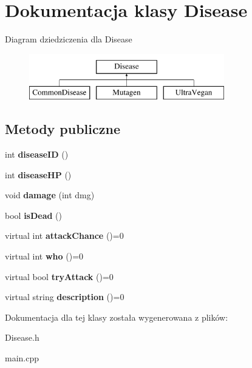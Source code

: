 \hypertarget{classDisease}{}\section{Dokumentacja klasy Disease}
\label{classDisease}
Diagram dziedziczenia dla Disease\begin{figure}[H]
\begin{center}
\leavevmode
\includegraphics[height=2.000000cm]{classDisease}
\end{center}
\end{figure}
\subsection*{Metody publiczne}
\begin{DoxyCompactItemize}
\item 
int {\bfseries disease\+ID} ()\hypertarget{classDisease_aa767f0483110104290041bddc272fdbb}{}\label{classDisease_aa767f0483110104290041bddc272fdbb}

\item 
int {\bfseries disease\+HP} ()\hypertarget{classDisease_af9f0bf00f479ca6ecafcaa1d4664631a}{}\label{classDisease_af9f0bf00f479ca6ecafcaa1d4664631a}

\item 
void {\bfseries damage} (int dmg)\hypertarget{classDisease_a8e453ce6d51ac090aada3bf7993d04d9}{}\label{classDisease_a8e453ce6d51ac090aada3bf7993d04d9}

\item 
bool {\bfseries is\+Dead} ()\hypertarget{classDisease_aec6c5373af8923c7eeb23ab8601298cb}{}\label{classDisease_aec6c5373af8923c7eeb23ab8601298cb}

\item 
virtual int {\bfseries attack\+Chance} ()=0\hypertarget{classDisease_ae527ac8784e17279f5b796f83c0374d4}{}\label{classDisease_ae527ac8784e17279f5b796f83c0374d4}

\item 
virtual int {\bfseries who} ()=0\hypertarget{classDisease_a08e55daa6094568570d869ac86fa1f3b}{}\label{classDisease_a08e55daa6094568570d869ac86fa1f3b}

\item 
virtual bool {\bfseries try\+Attack} ()=0\hypertarget{classDisease_a4186b72a74f3d2e654b38254ca0d32b7}{}\label{classDisease_a4186b72a74f3d2e654b38254ca0d32b7}

\item 
virtual string {\bfseries description} ()=0\hypertarget{classDisease_ab472fecd75428fa29567021314ff6bbe}{}\label{classDisease_ab472fecd75428fa29567021314ff6bbe}

\end{DoxyCompactItemize}


Dokumentacja dla tej klasy została wygenerowana z plików\+:\begin{DoxyCompactItemize}
\item 
Disease.\+h\item 
main.\+cpp\end{DoxyCompactItemize}
